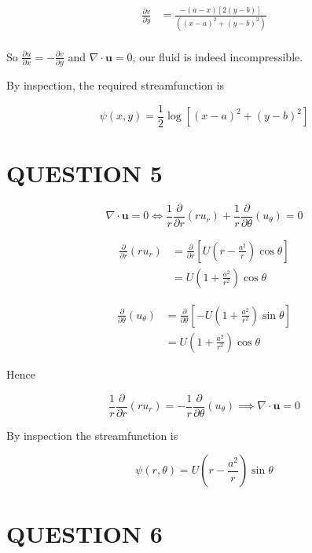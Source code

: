 \documentclass[a4paper]{article}
\begin{document}
\begin{align*}
\frac{\partial v }{\partial y} & = \frac{-(a-x)[2(y-b)] }{( (x-a)^{2} + (y-b)^{2}   )} \\
\end{align*}

So $  \frac{\partial u }{\partial x} = - \frac{\partial v }{\partial y} $ and $  \nabla \cdot \mathbf{u} = 0 $, our fluid is indeed incompressible.

By inspection, the required streamfunction is 

\[ \psi(x,y) = \frac{1}{2} \log \left[   (x-a)^{2} + (y-b)^{2}  \right]  \]

 


\section{QUESTION 5}

\[ \nabla \cdot \mathbf{u} = 0 \iff  \frac{1}{r} \frac{\partial }{\partial r}(ru_{r}) + \frac{1}{r} \frac{\partial }{\partial \theta}(u_{\theta}) = 0  \]

\begin{align*}
\frac{\partial }{\partial r}(ru_{r}) & = \frac{\partial }{\partial r} \left[  U \left(  r - \frac{a^{2}}{r} \right) \cos \theta \right]    \\
& = U \left(  1 + \frac{a^{2}}{r^{2}} \right) \cos \theta 
\end{align*}

\begin{align*}
\frac{\partial }{\partial \theta}(u_{\theta}) & = \frac{\partial }{\partial \theta} \left[ -U \left( 1 + \frac{a^{2}}{r^{2}} \right)  \sin \theta \right]    \\
& = U \left( 1 + \frac{a^{2}}{r^{2}} \right)  \cos \theta
\end{align*}

Hence 

\[  \frac{1}{r} \frac{\partial }{\partial r}(ru_{r}) = - \frac{1}{r} \frac{\partial }{\partial \theta}(u_{\theta}) \implies \nabla \cdot \mathbf{u} = 0  \]


By inspection the streamfunction is

\[ \psi(r,\theta) = U \left(  r - \frac{a^{2}}{r} \right) \sin \theta  \]




\section{QUESTION 6}
\end{document}
